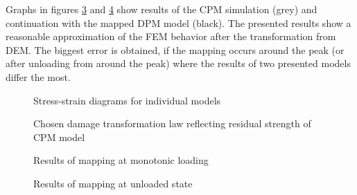 Graphs in figures \ref{figCouplingSequantialResultsMappingMonotonic} and \ref{figCouplingSequantialResultsMappingUnloaded} show results of the CPM simulation (grey) and continuation with the mapped DPM model (black).
The presented results show a reasonable approximation of the FEM behavior after the transformation from DEM.
The biggest error is obtained, if the mapping occurs around the peak (or after unloading from around the peak) where the results of two presented models differ the most.

\begin{figure}
	\centering
	\caption{Stress-strain diagrams for individual models}
	\label{figCouplingSequantialResultsPlain}
\end{figure}

\begin{figure}
	\centering
	\caption{Chosen damage transformation law reflecting residual strength of CPM model}
	\label{figCouplingSequantialResultsDmg}
\end{figure}

\begin{figure}
	\centering
	\caption{Results of mapping at monotonic loading}
	\label{figCouplingSequantialResultsMappingMonotonic}
\end{figure}

\begin{figure}
	\centering
	\caption{Results of mapping at unloaded state}
	\label{figCouplingSequantialResultsMappingUnloaded}
\end{figure}

